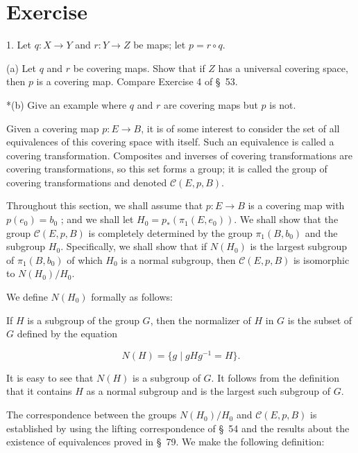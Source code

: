 \section*{Exercise}

1. Let \(q : X \rightarrow Y\) and \(r : Y \rightarrow Z\) be maps; let \(p = r \circ q\).

(a) Let \(q\) and \(r\) be covering maps. Show that if \(Z\) has a universal covering space, then \(p\) is a covering map. Compare Exercise 4 of \S\ 53.

*(b) Give an example where \(q\) and \(r\) are covering maps but \(p\) is not.


Given a covering map \(p : E \rightarrow B\), it is of some interest to consider the set of all equivalences of this covering space with itself. Such an equivalence is called a covering transformation. Composites and inverses of covering transformations are covering transformations, so this set forms a group; it is called the group of covering transformations and denoted \(\mathcal{C}( {E,p,B})\).

Throughout this section, we shall assume that \(p : E \rightarrow B\) is a covering map with \(p( e_{0}) = b_{0}\) ; and we shall let \(H_{0} = p_{ * }( {{\pi }_{1}( {E,e_{0}}) })\). We shall show that the group \(\mathcal{C}( {E,p,B})\) is completely determined by the group \({\pi }_{1}( {B,b_{0}})\) and the subgroup \(H_{0}\). Specifically, we shall show that if \(N( H_{0})\) is the largest subgroup of \({\pi }_{1}( {B,b_{0}})\) of which \(H_{0}\) is a normal subgroup, then \(\mathcal{C}( {E,p,B})\) is isomorphic to \(N( H_{0}) /H_{0}\).

We define \(N( H_{0})\) formally as follows:

\begin{definition}
	If \(H\) is a subgroup of the group \(G\), then the normalizer of \(H\) in \(G\) is the subset of \(G\) defined by the equation

\[
N( H) = \{ {g \mid {gH}g^{-1} = H}\}.
\]
\end{definition}

It is easy to see that \(N( H)\) is a subgroup of \(G\). It follows from the definition that it contains \(H\) as a normal subgroup and is the largest such subgroup of \(G\).

The correspondence between the groups \(N( H_{0}) /H_{0}\) and \(\mathcal{C}( {E,p,B})\) is established by using the lifting correspondence of \S\ 54 and the results about the existence of equivalences proved in \S\ 79. We make the following definition:

